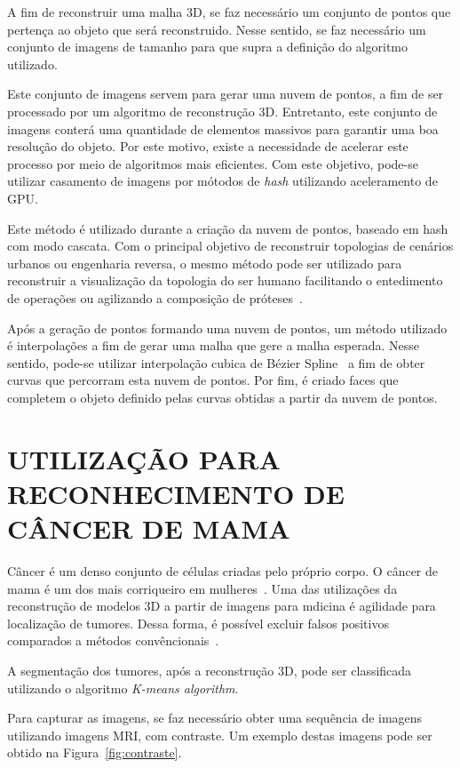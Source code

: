 \documentclass[letterpaper, 10 pt, conference]{ieeeconf}
\begin{document}
A fim de reconstruir uma malha 3D, se faz necessário um conjunto de pontos que pertença ao objeto que será reconstruido.
%
Nesse sentido, se faz necessário um conjunto de imagens de tamanho para que supra a definição do algoritmo utilizado.

Este conjunto de imagens servem para gerar uma nuvem de pontos, a fim de ser processado por um algoritmo de reconstrução 3D.
%
Entretanto, este conjunto de imagens conterá uma quantidade de elementos massivos para garantir uma boa resolução do objeto.
%
Por este motivo, existe a necessidade de acelerar este processo por meio de algoritmos mais eficientes.
%
Com este objetivo, pode-se utilizar casamento de imagens por mótodos de \textit{hash} utilizando aceleramento de GPU.

Este método é utilizado durante a criação da nuvem de pontos, baseado em hash com modo cascata.
%
Com o principal objetivo de reconstruir topologias de cenários urbanos ou engenharia reversa, o mesmo método pode ser utilizado para reconstruir a visualização da topologia do ser humano facilitando o entedimento de operações ou agilizando a composição de próteses~\cite{Xu2018May}.

Após a geração de pontos formando uma nuvem de pontos, um método utilizado é interpolações a fim de gerar uma malha que gere a malha esperada.
%
Nesse sentido, pode-se utilizar interpolação cubica de Bézier Spline~\cite{sue2017} a fim de obter curvas que percorram esta nuvem de pontos.
%
Por fim, é criado faces que completem o objeto definido pelas curvas obtidas a partir da nuvem de pontos.

\section{UTILIZAÇÃO PARA RECONHECIMENTO DE CÂNCER DE MAMA}

Câncer é um denso conjunto de células criadas pelo próprio corpo.
%
O câncer de mama é um dos mais corriqueiro em mulheres~\cite{Gnonnou2014Nov}.
%
Uma das utilizações da reconstrução de modelos 3D a partir de imagens para mdicina é agilidade para localização de tumores.
%
Dessa forma, é possível excluir falsos positivos comparados a métodos convêncionais~\cite{Gnonnou2014Nov}.

A segmentação dos tumores, após a reconstrução 3D, pode ser classificada utilizando o algoritmo \textit{K-means algorithm}.

Para capturar as imagens, se faz necessário obter uma sequência de imagens utilizando imagens MRI, com contraste.
%
Um exemplo destas imagens pode ser obtido na Figura~\ref{fig:contraste}.
\end{document}

